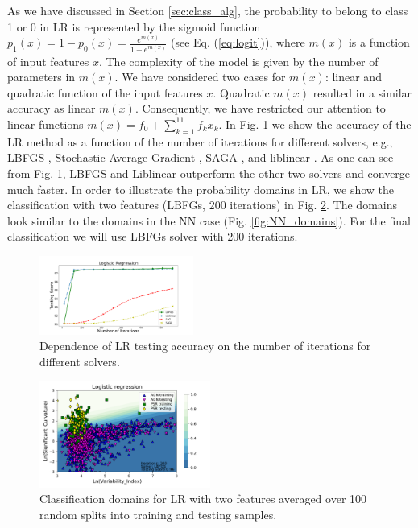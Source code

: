 \documentclass{aa}
\newcommand{\twopicsp}{0.45}
\begin{document}
As we have discussed in Section \ref{sec:class_alg}, 
the probability to belong to class 1 or 0 in LR is represented by the sigmoid function
$p_1(x) = 1 - p_0(x) = \frac{e^{m(x)}}{1 + e^{m(x)}}$ (see Eq. (\ref{eq:logit})),
where $m(x)$ is a function of input features $x$.
The complexity of the model is given by the number of parameters in $m(x)$.
We have considered two cases for $m(x)$: linear and quadratic function of the input features $x$.
Quadratic $m(x)$ resulted in a similar accuracy as linear $m(x)$.
Consequently, we have restricted our attention to linear functions $m(x) = f_0 + \sum_{k = 1}^{11} f_k x_k$.
In Fig. \ref{fig:LR_accuracy} we show the accuracy of the LR method as a function of the number of iterations
for different solvers, e.g., LBFGS \citep{lbfgs}, Stochastic Average Gradient \citep[SAG,][]{sag}, SAGA \citep[a variant of SAG,][]{saga},
and liblinear \citep[a special solver for LR and support vector machine classifications,][]{ll}.
As one can see from Fig. \ref{fig:LR_accuracy}, LBFGS and Liblinear outperform the other two solvers and converge much faster.
In order to illustrate the probability domains in LR, we show the classification with two features (LBFGs, 200 iterations)
in Fig. \ref{fig:LR_domains}. The domains look similar to the domains in the NN case (Fig. \ref{fig:NN_domains}).
For the final classification we will use LBFGs solver with 200 iterations.


\begin{figure}[h]
\centering
\includegraphics[width=\twopicsp\textwidth]{plots/lr_train_assocnewfeat.pdf}
\caption{Dependence of LR testing accuracy on the number of iterations for different solvers.}
\label{fig:LR_accuracy}
\end{figure}



\begin{figure}[h]
\centering
\includegraphics[width=0.5\textwidth]{plots/classification_domains/lr_200_lbfgs.pdf}
\caption{Classification domains for LR with two features 
averaged over 100 random splits into training and testing samples.}
\label{fig:LR_domains}
\end{figure}
\end{document}
